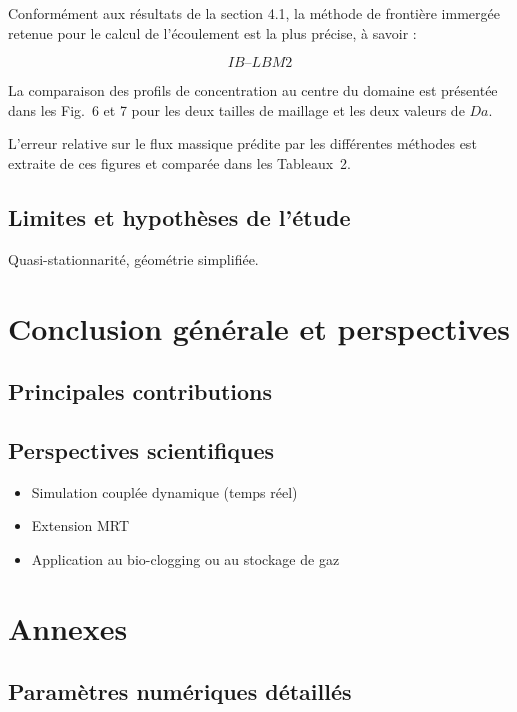 \documentclass[12pt,a4paper]{report}
\begin{document}
Conformément aux résultats de la section 4.1, la méthode de frontière immergée retenue pour le calcul de l’écoulement est la plus précise, à savoir :

\begin{equation}
IB\text{--}LBM2
\end{equation}

La comparaison des profils de concentration au centre du domaine est présentée dans les Fig.~6 et 7 pour les deux tailles de maillage et les deux valeurs de $Da$.

L’erreur relative sur le flux massique prédite par les différentes méthodes est extraite de ces figures et comparée dans les Tableaux~2.

\section{Limites et hypothèses de l’étude}
Quasi-stationnarité, géométrie simplifiée.


\chapter{Conclusion générale et perspectives}

\section{Principales contributions}
\section{Perspectives scientifiques}
\begin{itemize}
    \item Simulation couplée dynamique (temps réel)
    \item Extension MRT
    \item Application au bio-clogging ou au stockage de gaz
\end{itemize}


\appendix
\chapter{Annexes}
\section{Paramètres numériques détaillés}
\end{document}
